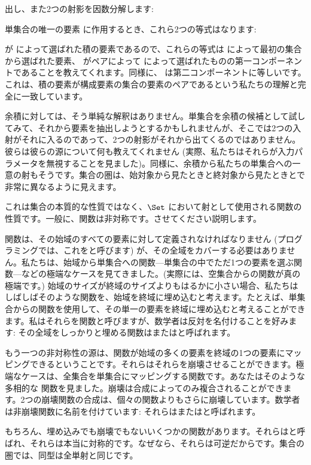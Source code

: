 出し、また2つの射影を因数分解します: 

単集合の唯一の要素 \code{()} に作用するとき、これら2つの等式はなります: 

 が  によって選ばれた積の要素であるので、これらの等式は  によって最初の集合から選ばれた要素、 がペアによって  によって選ばれたものの第一コンポーネントであることを教えてくれます。同様に、 は第二コンポーネントに等しいです。これは、積の要素が構成要素の集合の要素のペアであるという私たちの理解と完全に一致しています。

余積に対しては、そう単純な解釈はありません。単集合を余積の候補として試してみて、それから要素を抽出しようとするかもしれませんが、そこでは2つの入射がそれに入るのであって、2つの射影がそれから出てくるのではありません。彼らは彼らの源について何も教えてくれません (実際、私たちはそれらが入力パラメータを無視することを見ました)。同様に、余積から私たちの単集合への一意の射もそうです。集合の圏は、始対象から見たときと終対象から見たときとで非常に異なるように見えます。

これは集合の本質的な性質ではなく、$\Set$ において射として使用される関数の性質です。一般に、関数は非対称です。させてください説明します。

関数は、その始域のすべての要素に対して定義されなければなりません (プログラミングでは、これをと呼びます) が、その全域をカバーする必要はありません。私たちは、始域から単集合への関数---単集合の中でただ1つの要素を選ぶ関数---などの極端なケースを見てきました。(実際には、空集合からの関数が真の極端です。) 始域のサイズが終域のサイズよりもはるかに小さい場合、私たちはしばしばそのような関数を、始域を終域に埋め込むと考えます。たとえば、単集合からの関数を使用して、その単一の要素を終域に埋め込むと考えることができます。私はそれらを関数と呼びますが、数学者は反対を名付けることを好みます: その全域をしっかりと埋める関数はまたはと呼ばれます。

もう一つの非対称性の源は、関数が始域の多くの要素を終域の1つの要素にマッピングできるということです。それらはそれらを崩壊させることができます。極端なケースは、全集合を単集合にマッピングする関数です。あなたはそのような多相的な  関数を見ました。崩壊は合成によってのみ複合されることができます。2つの崩壊関数の合成は、個々の関数よりもさらに崩壊しています。数学者は非崩壊関数に名前を付けています: それらはまたはと呼ばれます。

もちろん、埋め込みでも崩壊でもないいくつかの関数があります。それらはと呼ばれ、それらは本当に対称的です。なぜなら、それらは可逆だからです。集合の圏では、同型は全単射と同じです。

